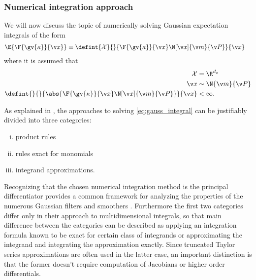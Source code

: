 \subsubsection{Numerical integration approach}
 We will now discuss the topic of numerically solving Gaussian 
 expectation integrals of the form
 \begin{align}
	\E{\F{\gv{\kappa}}{\x}}&\equiv \defint{\mathcal{X}}{}{\F{\gv{\kappa}}{\x}\N[\x]{\m}{\P}}{\x}
	\label{eq:gauss_integral}
\end{align}%
where it is assumed that 
\begin{align}
	\mathcal{X} &= \R^{d_x}\\
	\x &\sim \N{\m}{\P}\\
	\defint{}{}{\abs{\F{\gv{\kappa}}{\x}\N[\x]{\m}{\P}}}{\x} & < \infty. 
\end{align}

As explained in \textcite{Wu2006}, the approaches to solving \eqref{eq:gauss_integral}
can be justifiably divided into three categories: 
\begin{enumerate}[i)] \addtolength{\leftskip}{.5cm} \itemsep1pt \parskip0pt 
  \item product rules
  \item rules exact for monomials
  \item integrand approximations.
\end{enumerate}
Recognizing that the chosen numerical integration method is the principal differentiator provides a 
common framework for analyzing the properties of the numerous Gaussian filters and smoothers \parencite{Sarkka2010, Sarkka2008a}.
Furthermore the first two categories differ only in their approach to multidimensional integrals,
so that main difference between the categories can be described
as applying an integration formula known to be exact for certain class of integrands
or approximating the integrand and integrating the approximation exactly.
Since truncated Taylor series approximations are often used in the latter case, an important distinction
is that the former doesn't require computation of Jacobians or higher order differentials. 


